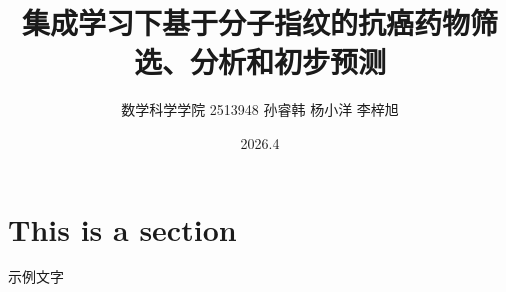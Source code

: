\documentclass[12pt,a4paper]{article}
\title{\heiti\zihao{2} 集成学习下基于分子指纹的抗癌药物筛选、分析和初步预测}
\author{\songti 数学科学学院 2513948 孙睿韩\n化学学院 2511643 杨小洋\n统计与数据科学学院 2510743 李梓旭}
\date{2026.4}
\begin{document}
    \maketitle
\begin{abstract}
    \lipsum[2]
\end{abstract}
\tableofcontents
\section{This is a section}
示例文字
\end{document}
